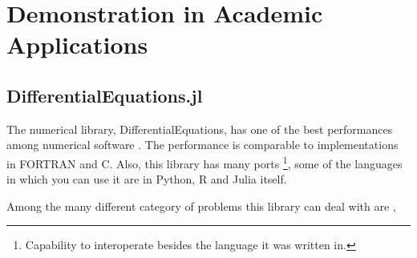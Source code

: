 \documentclass[
12pt,				%
openright,			%
oneside,			%
a4paper,			%
brazil,				%
english,			%
]{abntex2}
\begin{document}
\section{Demonstration in Academic Applications}

\subsection{DifferentialEquations.jl}

The numerical library, DifferentialEquations, has one of the best
performances among numerical software
\cite{rackauckas2017differentialequations}. The performance is
comparable to implementations in FORTRAN and C. Also, this library has
many ports \footnote{Capability to interoperate besides the language it
was written in.}, some of the languages in which you can use it are in Python, R and Julia itself.

Among the many different category of problems this library can deal
with are \cite{rackauckas2019confederated,rackauckas2017adaptive,rackauckas_stability-optimized_2018,sykora2020stochasticdelaydiffeq,rackauckas2018comparison,rackauckas2019diffeqflux,rackauckas2020universal,gowda2019sparsity,ma2021modelingtoolkit},
\end{document}
